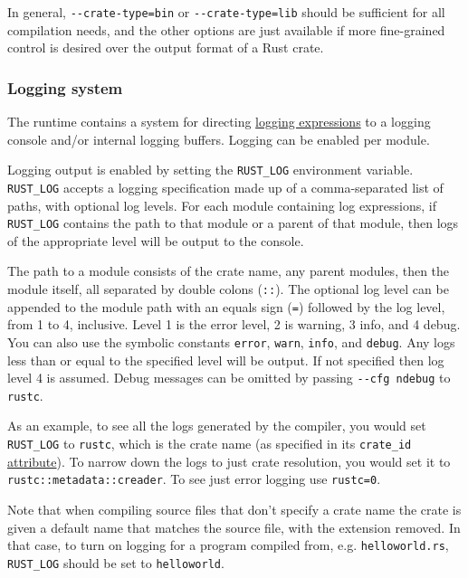 \documentclass[]{article}
\begin{document}
In general, \texttt{-\/-crate-type=bin} or \texttt{-\/-crate-type=lib}
should be sufficient for all compilation needs, and the other options
are just available if more fine-grained control is desired over the
output format of a Rust crate.

\subsubsection{Logging system}\label{logging-system}

The runtime contains a system for directing
\hyperref[logging-expressions]{logging expressions} to a logging console
and/or internal logging buffers. Logging can be enabled per module.

Logging output is enabled by setting the \texttt{RUST\_LOG} environment
variable. \texttt{RUST\_LOG} accepts a logging specification made up of
a comma-separated list of paths, with optional log levels. For each
module containing log expressions, if \texttt{RUST\_LOG} contains the
path to that module or a parent of that module, then logs of the
appropriate level will be output to the console.

The path to a module consists of the crate name, any parent modules,
then the module itself, all separated by double colons (\texttt{::}).
The optional log level can be appended to the module path with an equals
sign (\texttt{=}) followed by the log level, from 1 to 4, inclusive.
Level 1 is the error level, 2 is warning, 3 info, and 4 debug. You can
also use the symbolic constants \texttt{error}, \texttt{warn},
\texttt{info}, and \texttt{debug}. Any logs less than or equal to the
specified level will be output. If not specified then log level 4 is
assumed. Debug messages can be omitted by passing
\texttt{-\/-cfg ndebug} to \texttt{rustc}.

As an example, to see all the logs generated by the compiler, you would
set \texttt{RUST\_LOG} to \texttt{rustc}, which is the crate name (as
specified in its \texttt{crate\_id} \hyperref[attributes]{attribute}).
To narrow down the logs to just crate resolution, you would set it to
\texttt{rustc::metadata::creader}. To see just error logging use
\texttt{rustc=0}.

Note that when compiling source files that don't specify a crate name
the crate is given a default name that matches the source file, with the
extension removed. In that case, to turn on logging for a program
compiled from, e.g. \texttt{helloworld.rs}, \texttt{RUST\_LOG} should be
set to \texttt{helloworld}.
\end{document}
